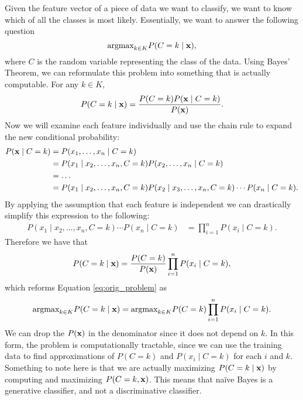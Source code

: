 Given the feature vector of a piece of data we want to classify, we want to know which of all the classes is most likely. Essentially, we want to answer the following question
\begin{equation}\label{eq:orig_problem}
    \mbox{argmax}_{k\in K} P(C=k \mid \mathbf{x}),
\end{equation}
where $C$ is the random variable representing the class of the data.
Using Bayes' Theorem, we can reformulate this problem into something that is actually computable. For any $k\in K$,
\begin{align*}
    P(C=k \mid \mathbf{x}) = \frac{P(C=k)P(\mathbf{x} \mid C=k)}{P(\mathbf{x})}.
\end{align*}
Now we will examine each feature individually and use the chain rule to expand the new conditional probability:
\begin{align*}
    P(\mathbf{x} \mid C=k) &= P(x_1,\dots,x_n \mid C=k) \\
    &= P(x_1 \mid x_2,\dots,x_n,C=k)P(x_2,\dots,x_n \mid C=k) \\
    &= \dots \\
    &= P(x_1 \mid x_2,\dots,x_n,C=k)P(x_2 \mid x_3, \dots, x_n,C=k)\cdots P(x_n \mid C=k).
\end{align*}
By applying the assumption that each feature is independent we can drastically simplify this expression to the following:
\begin{align*}
    P(x_1 \mid x_2,\dots,x_n,C=k)\cdots P(x_n \mid C=k) &= \prod_{i=1}^{n}P(x_i \mid C=k).
\end{align*}
Therefore we have that 
\begin{align*}
    P(C=k \mid \mathbf{x}) = \frac{P(C=k)}{P(\mathbf{x})} \prod_{i=1}^{n}P(x_i \mid C=k),
\end{align*}
which reforms Equation \ref{eq:orig_problem} as
\begin{equation}\label{eq:simple_problem}
    \mbox{argmax}_{k\in K} P(C=k \mid \mathbf{x}) = \mbox{argmax}_{k\in K} P(C=k)\prod_{i=1}^{n}P(x_i \mid C=k).
\end{equation}
We can drop the $P(\mathbf{x})$ in the denominator since it does not depend on $k$.
In this form, the problem is computationally tractable,
since we can use the training data to find approximations of $P(C=k)$ and $P(x_i \mid C=k)$ for each $i$ and $k$.
Something to note here is that we are actually maximizing $P(C=k \mid \mathbf{x})$ by computing and maximizing $P(C=k,\mathbf{x})$.
This means that naïve Bayes is a generative classifier, and not a discriminative classifier.

